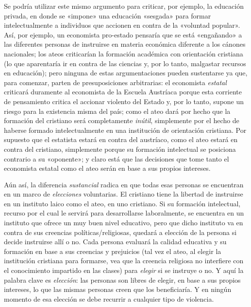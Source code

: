 \documentclass[12pt,a4paper,twoside]{book}
\begin{document}
Se podría utilizar este mismo argumento para criticar, por ejemplo, la educación privada, en donde se «impone» una educación «sesgada» para formar intelectualmente a individuos que accionen en contra de la «voluntad popular». Así, por ejemplo, un economista pro-estado pensaría que se está «engañando» a las diferentes personas de instruirse en materia económica diferente a los cánones nacionales; los ateos criticarían la formación académica con orientación cristiana (lo que aparentaría ir en contra de las ciencias y, por lo tanto, malgastar recursos en educación); pero ninguna de estas argumentaciones pueden sustentarse ya que, para comenzar, parten de presuposiciones arbitrarias: el economista \textit{estatal} criticará duramente al economista de la Escuela Austríaca porque esta corriente de pensamiento critica el accionar violento del Estado y, por lo tanto, supone un riesgo para la existencia misma del país; como el ateo dará por hecho que la formación del cristiano será completamente \textit{inútil}, simplemente por el hecho de haberse formado intelectualmente en una institución de orientación cristiana. Por supuesto que el estatista estará en contra del austríaco, como el ateo estará en contra del cristiano, simplemente porque su formación intelectual se posiciona contrario a su «oponente»; y claro está que las decisiones que tome tanto el economista estatal como el ateo serán en base a sus propios intereses.

Aún así, la diferencia \textit{sustancial} radica en que todas esas personas se encuentran en un marco de \textit{elecciones} voluntarias. El cristiano tiene la libertad de instruirse en un instituto laico como el ateo, en uno cristiano. Si su formación intelectual, recurso por el cual le servirá para desarrollarse laboralmente, se encuentra en un instituto que ofrece un muy buen nivel educativo, pero que dicho instituto va en contra de sus creencias políticas/religiosas, quedará a elección de la persona si decide instruirse allí o no. Cada persona evaluará la calidad educativa y su formación en base a sus creencias y prejuicios (tal vez el ateo, al elegir la institución cristiana para formarse, vea que la creencia religiosa no interfiere con el conocimiento impartido en las clases) para \textit{elegir} si se instruye o no. Y aquí la palabra clave es \textit{elección}: las personas son libres de elegir, en base a sus propios intereses, lo que las mismas personas creen que los beneficiaría. Y en ningún momento de esa elección se debe recurrir a cualquier tipo de violencia.
\end{document}
